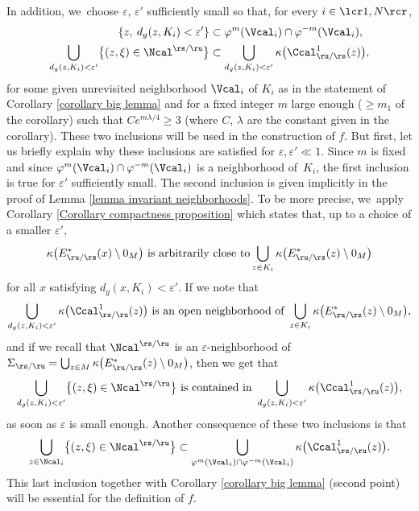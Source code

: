 In addition, we~choose $\varepsilon$, $\varepsilon'$ sufficiently small so that, for every $i\in\lcr1,N\rcr$,
\begin{align*}
\left\{ z, \: d_g (z,K_i) < \varepsilon' \right\} &\subset \varphi^m (\Vcal_i) \cap \varphi^{-m} (\Vcal_i), \\
\bigcup_{d_g (z,K_i) < \varepsilon'} \bigl\{ (z,\xi) \in \Ncal^{\rs/\ru} \bigr\} &\subset \bigcup_{d_g (z,K_i) < \varepsilon'} \kappa \bigl(\Ccal_{\ru/\rs}^1 (z) \bigr),
\end{align*}
for some given unrevisited neighborhood $\Vcal_i$ of $K_i$ as in the statement of Corollary \ref{corollary big lemma} and for a fixed integer $m$ large enough ($\geq m_1$ of the corollary) such that $C e^{m\lambda/4} \geq 3$ (where $C$, $\lambda$ are the constant given in the corollary). These two inclusions will be used in the construction of $f$. But first, let us briefly explain why these inclusions are satisfied for $\varepsilon, \varepsilon' \ll 1$. Since $m$ is fixed and since $\varphi^m (\Vcal_i) \cap \varphi^{-m} (\Vcal_i)$ is a neighborhood of~$K_i$, the first inclusion is true for $\varepsilon'$ sufficiently small. The second inclusion is given implicitly in the proof of Lemma \ref{lemma invariant neighborhoods}. To be more precise, we~apply Corollary \ref{Corollary compactness proposition} which states that, up to a choice of a smaller $\varepsilon'$,
\[
\kappa \bigl(E_{\ru/\rs}^* (x) \setminus 0_M \bigr) \text{ is arbitrarily close to} \bigcup_{z \in K_i} \kappa \bigl(E_{\ru/\rs}^* (z) \setminus 0_M \bigr)
\]
for all $x$ satisfying $d_g (x,K_i) < \varepsilon'$. If we note that
\[
\bigcup_{d_g (z,K_i) < \varepsilon'} \kappa \bigl(\Ccal_{\rs/\ru}^1 (z) \bigr) \text{ is an open neighborhood of } \bigcup_{z \in K_i} \kappa \bigl(E_{\ru/\rs}^* (z) \setminus 0_M \bigr),
\]
and if we recall that $\Ncal^{\rs/\ru}$ is an $\varepsilon$-neighborhood of $\Sigma_{\rs/\ru} = \bigcup_{z \in M} \kappa \bigl(E_{\ru/\rs}^* (z) \setminus 0_M \bigr)$, then we get that
\[
\bigcup_{ d_g (z,K_i) < \varepsilon'}\bigl\{ (z,\xi) \in \Ncal^{\rs/\ru} \bigr\} \text{ is contained in } \bigcup_{d_g (z,K_i) < \varepsilon'} \kappa \bigl(\Ccal_{\rs/\ru}^1 (z) \bigr),
\]
as soon as $\varepsilon$ is small enough. Another consequence of these two inclusions is that
\begin{equation}\label{eq: proof escape function - inclusion of neighborhoods}
\bigcup_{z \in \Ncal_i} \bigl\{ (z,\xi) \in \Ncal^{\rs/\ru} \bigr\} \subset \bigcup_{\varphi^m (\Vcal_i) \cap \varphi^{-m} (\Vcal_i)} \kappa \bigl(\Ccal_{\rs/\ru}^1 (z) \bigr).
\end{equation}
This last inclusion together with Corollary \ref{corollary big lemma} (second point) will be essential for the definition of $f$.

